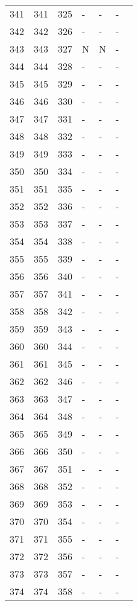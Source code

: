 \begin{longtable}{rrrllll}
  341 & 341 & 325 & - & - & - &  \\ 
  342 & 342 & 326 & - & - & - &  \\ 
  343 & 343 & 327 & N & N & - &  \\ 
  344 & 344 & 328 & - & - & - &  \\ 
  345 & 345 & 329 & - & - & - &  \\ 
  346 & 346 & 330 & - & - & - &  \\ 
  347 & 347 & 331 & - & - & - &  \\ 
  348 & 348 & 332 & - & - & - &  \\ 
  349 & 349 & 333 & - & - & - &  \\ 
  350 & 350 & 334 & - & - & - &  \\ 
  351 & 351 & 335 & - & - & - &  \\ 
  352 & 352 & 336 & - & - & - &  \\ 
  353 & 353 & 337 & - & - & - &  \\ 
  354 & 354 & 338 & - & - & - &  \\ 
  355 & 355 & 339 & - & - & - &  \\ 
  356 & 356 & 340 & - & - & - &  \\ 
  357 & 357 & 341 & - & - & - &  \\ 
  358 & 358 & 342 & - & - & - &  \\ 
  359 & 359 & 343 & - & - & - &  \\ 
  360 & 360 & 344 & - & - & - &  \\ 
  361 & 361 & 345 & - & - & - &  \\ 
  362 & 362 & 346 & - & - & - &  \\ 
  363 & 363 & 347 & - & - & - &  \\ 
  364 & 364 & 348 & - & - & - &  \\ 
  365 & 365 & 349 & - & - & - &  \\ 
  366 & 366 & 350 & - & - & - &  \\ 
  367 & 367 & 351 & - & - & - &  \\ 
  368 & 368 & 352 & - & - & - &  \\ 
  369 & 369 & 353 & - & - & - &  \\ 
  370 & 370 & 354 & - & - & - &  \\ 
  371 & 371 & 355 & - & - & - &  \\ 
  372 & 372 & 356 & - & - & - &  \\ 
  373 & 373 & 357 & - & - & - &  \\ 
  374 & 374 & 358 & - & - & - &  \\ 

\end{longtable}
